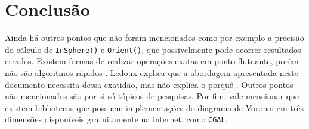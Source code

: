 \section{Conclusão}

Ainda há outros pontos que não foram mencionados como por exemplo
a precisão do cálculo de \texttt{InSphere()} e \texttt{Orient()}, 
que possivelmente pode ocorrer resultados errados. Existem formas
de realizar operações exatas em ponto flutuante, porém não são
algoritmos rápidos \cite{Yap94theexact}. Ledoux explica que a 
abordagem apresentada neste documento necessita dessa exatidão,
mas não explica o porquê \cite{Ledoux2007}. Outros pontos não 
mencionados são por si só tópicos de pesquisas. Por fim, vale 
mencionar que existem bibliotecas que possuem implementações 
do diagrama de Voronoi em três dimensões disponíveis gratuitamente
na internet, como \texttt{CGAL}. 